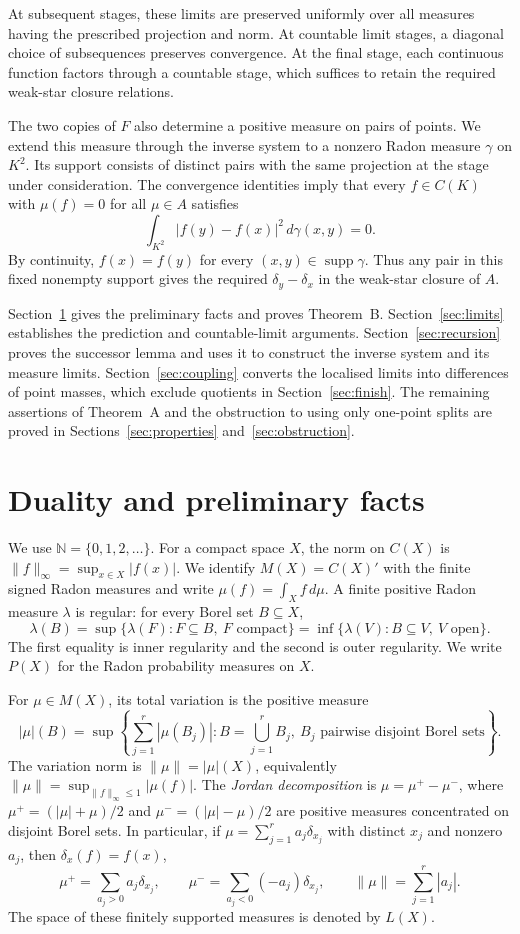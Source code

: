 \documentclass[a4paper,11pt]{amsart}
\theoremstyle{plain}
\theoremstyle{definition}
\theoremstyle{remark}
\newcommand{\N}{\mathbb N}
\newcommand{\supp}{\operatorname{supp}}
\numberwithin{equation}{section}
\begin{document}
At subsequent stages, these limits are preserved uniformly over all
measures having the prescribed projection and norm. At countable limit
stages, a diagonal choice of subsequences preserves convergence. At the
final stage, each continuous function factors through a countable stage,
which suffices to retain the required weak-star closure relations.

The two copies of $F$ also determine a positive measure on pairs of
points. We extend this measure through the inverse system to a nonzero
Radon measure $\gamma$ on $K^2$. Its support consists of distinct pairs
with the same projection at the stage under consideration. The convergence
identities imply that every $f\in C(K)$ with $\mu(f)=0$ for all $\mu\in A$
satisfies
\[
\int_{K^2}|f(y)-f(x)|^2\,d\gamma(x,y)=0.
\]
By continuity, $f(x)=f(y)$ for every $(x,y)\in\supp\gamma$.
Thus any pair in this fixed nonempty support gives the required
$\delta_y-\delta_x$ in the weak-star closure of $A$.

Section~\ref{sec:prelim} gives the preliminary facts and proves Theorem~B.
Section~\ref{sec:limits} establishes the prediction and countable-limit
arguments. Section~\ref{sec:recursion} proves the successor lemma and
uses it to construct the inverse system and its measure limits.
Section~\ref{sec:coupling} converts the localised limits into differences
of point masses, which exclude quotients in Section~\ref{sec:finish}.
The remaining assertions of Theorem~A and the obstruction to using only
one-point splits are proved in Sections~\ref{sec:properties}
and~\ref{sec:obstruction}.

\section{Duality and preliminary facts}\label{sec:prelim}

We use $\N=\{0,1,2,\ldots\}$. For a compact space $X$, the norm on
$C(X)$ is $\|f\|_\infty=\sup_{x\in X}|f(x)|$. We identify $M(X)=C(X)'$
with the finite signed Radon measures and write
$\mu(f)=\int_X f\,d\mu$. A finite positive Radon measure $\lambda$ is
regular: for every Borel set $B\subseteq X$,
\[
\lambda(B)=\sup\{\lambda(F):F\subseteq B,\ F\text{ compact}\}
=\inf\{\lambda(V):B\subseteq V,\ V\text{ open}\}.
\]
The first equality is inner regularity and the second is outer regularity.
We write $P(X)$ for the Radon probability measures on $X$.

For $\mu\in M(X)$, its total variation is the positive measure
\[
|\mu|(B)=\sup\left\{\sum_{j=1}^r|\mu(B_j)|:
 B=\bigcup_{j=1}^r B_j,\ B_j\text{ pairwise disjoint Borel sets}\right\}.
\]
The variation norm is $\|\mu\|=|\mu|(X)$, equivalently
$\|\mu\|=\sup_{\|f\|_\infty\leqslant1}|\mu(f)|$.
The \emph{Jordan decomposition} is $\mu=\mu^+-\mu^-$, where
$\mu^+=(|\mu|+\mu)/2$ and $\mu^-=(|\mu|-\mu)/2$ are positive measures concentrated on disjoint Borel sets. In particular, if
$\mu=\sum_{j=1}^r a_j\delta_{x_j}$ with distinct $x_j$ and nonzero $a_j$,
then $\delta_x(f)=f(x)$,
\[
\mu^+=\sum_{a_j>0}a_j\delta_{x_j},\qquad
\mu^-=\sum_{a_j<0}(-a_j)\delta_{x_j},\qquad
\|\mu\|=\sum_{j=1}^r|a_j|.
\]
The space of these finitely supported measures is denoted by $L(X)$.
\end{document}
